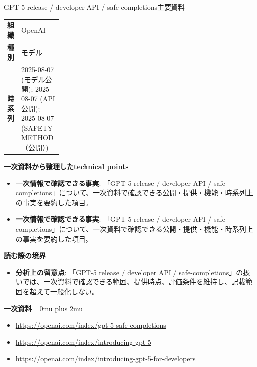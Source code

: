 \begin{technicalnote}{GPT-5 release / developer API / safe-completions}{主要資料}
\begingroup
\begin{tabularx}{\linewidth}{@{}>{\bfseries}p{0.22\linewidth}X@{}}
組織 & OpenAI \\
種別 & モデル \\
時系列 & 2025-08-07 (モデル公開); 2025-08-07 (API公開); 2025-08-07 (SAFETY METHOD（公開）) \\
\end{tabularx}
\smallskip
{\bfseries 一次資料から整理したtechnical points}
\begin{itemize}[leftmargin=1.5em,itemsep=0.35em]
\item \textbf{一次情報で確認できる事実}: 「GPT-5 release / developer API / safe-completions」について、一次資料で確認できる公開・提供・機能・時系列上の事実を要約した項目。
\item \textbf{一次情報で確認できる事実}: 「GPT-5 release / developer API / safe-completions」について、一次資料で確認できる公開・提供・機能・時系列上の事実を要約した項目。
\end{itemize}
\begin{minipage}{\linewidth}
{\bfseries 読む際の境界}
\begin{itemize}[leftmargin=1.5em,itemsep=0.35em]
\item \textbf{分析上の留意点}: 「GPT-5 release / developer API / safe-completions」の扱いでは、一次資料で確認できる範囲、提供時点、評価条件を維持し、記載範囲を超えて一般化しない。
\end{itemize}
\begin{samepage}
{\bfseries 一次資料}
\begingroup\sloppy
\Urlmuskip=0mu plus 2mu\relax
\begin{itemize}[leftmargin=1.5em,itemsep=0.25em]
\item {\scriptsize\url{https://openai.com/index/gpt-5-safe-completions}}
\item {\scriptsize\url{https://openai.com/index/introducing-gpt-5}}
\item {\scriptsize\url{https://openai.com/index/introducing-gpt-5-for-developers}}
\end{itemize}
\endgroup
\end{samepage}
\end{minipage}
\endgroup
\end{technicalnote}
\medskip

